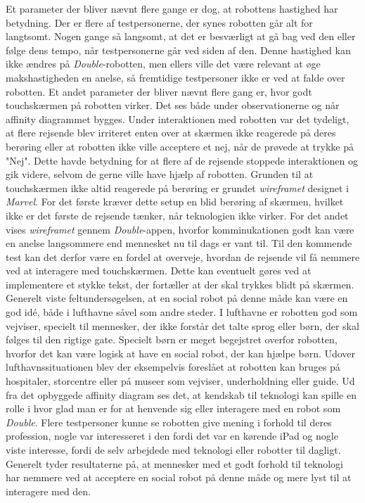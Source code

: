Et parameter der bliver nævnt flere gange er dog, at robottens hastighed har betydning. Der er flere af testpersonerne, der synes robotten går alt for langtsomt. Nogen gange så langsomt, at det er besværligt at gå bag ved den eller følge dens tempo, når testpersonerne går ved siden af den. Denne hastighed kan ikke ændres på \textit{Double}-robotten, men ellers ville det være relevant at øge makshastigheden en anelse, så fremtidige testpersoner ikke er ved at falde over robotten.\blankline
%
Et andet parameter der bliver nævnt flere gang er, hvor godt touchskærmen på robotten virker. Det ses både under observationerne og når affinity diagrammet bygges. Under interaktionen med robotten var det tydeligt, at flere rejsende blev irriteret enten over at skærmen ikke reagerede på deres berøring eller at robotten ikke ville acceptere et nej, når de prøvede at trykke på "Nej". Dette havde betydning for at flere af de rejsende stoppede interaktionen og gik videre, selvom de gerne ville have hjælp af robotten. Grunden til at touchskærmen ikke altid reagerede på berøring er grundet \textit{wireframet} designet i \textit{Marvel}. For det første kræver dette setup en blid berøring af skærmen, hvilket ikke er det første de rejsende tænker, når teknologien ikke virker. For det andet vises \textit{wireframet} gennem \textit{Double}-appen, hvorfor komminukationen godt kan være en anelse langsommere end mennesket nu til dags er vant til. Til den kommende test kan det derfor være en fordel at overveje, hvordan de rejsende vil få nemmere ved at interagere med touchskærmen. Dette kan eventuelt gøres ved at implementere et stykke tekst, der fortæller at der skal trykkes blidt på skærmen.\blankline
%
Generelt viste feltundersøgelsen, at en social robot på denne måde kan være en god idé, både i lufthavne såvel som andre steder. I lufthavne er robotten god som vejviser, specielt til mennesker, der ikke forstår det talte sprog eller børn, der skal følges til den rigtige gate. Specielt børn er meget begejstret overfor robotten, hvorfor det kan være logisk at have en social robot, der kan hjælpe børn. Udover lufthavnssituationen blev der eksempelvis foreslået at robotten kan bruges på hospitaler, storcentre eller på museer som vejviser, underholdning eller guide. Ud fra det opbyggede affinity diagram ses det, at kendskab til teknologi kan spille en rolle i hvor glad man er for at henvende sig eller interagere med en robot som \textit{Double}. Flere testpersoner kunne se robotten give mening i forhold til deres profession, nogle var interesseret i den fordi det var en kørende iPad og nogle viste interesse, fordi de selv arbejdede med teknologi eller robotter til dagligt. Generelt tyder resultaterne på, at mennesker med et godt forhold til teknologi har nemmere ved at acceptere en social robot på denne måde og mere lyst til at interagere med den. 


